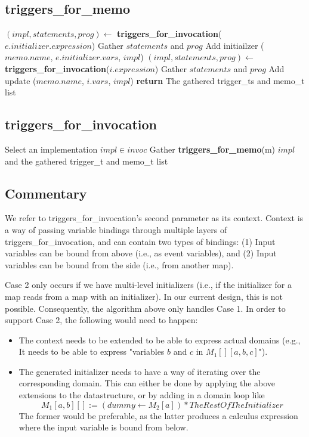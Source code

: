 \documentclass[11pt]{amsart}
\begin{document}
\subsection{triggers\_for\_memo}
\begin{algorithmic}
  \STATE $(impl,statements,prog) \gets$ \textbf{triggers\_for\_invocation}($e.initializer.expression$)
  \STATE Gather $statements$ and $prog$
  \STATE Add initiailzer ($memo.name$, $e.initializer.vars$, $impl$)
    \STATE $(impl,statements,prog) \gets$ \textbf{triggers\_for\_invocation}($i.expression$)
    \STATE Gather $statements$ and $prog$
    \STATE Add update ($memo.name$, $i.vars$, $impl$)
  \ENDFOR
\ENDFOR
\STATE \textbf{return} The gathered trigger\_ts and memo\_t list
\end{algorithmic}

\subsection{triggers\_for\_invocation}
\begin{algorithmic}
\STATE Select an implementation $impl \in invoc$
  \STATE Gather \textbf{triggers\_for\_memo}(m)
\ENDFOR
\RETURN $impl$ and the gathered trigger\_t and memo\_t list
\end{algorithmic}

\subsection{Commentary}
We refer to triggers\_for\_invocation's second parameter as its context.  Context is a way of passing variable bindings through multiple layers of triggers\_for\_invocation, and can contain two types of bindings: (1) Input variables can be bound from above (i.e., as event variables), and (2) Input variables can be bound from the side (i.e., from another map).  

Case 2 only occurs if we have multi-level initializers (i.e., if the initializer for a map reads from a map with an initializer).  In our current design, this is not possible.  Consequently, the algorithm above only handles Case 1.  In order to support Case 2, the following would need to happen:
\begin{itemize}
\item The context needs to be extended to be able to express actual domains (e.g., It needs to be able to express "variables $b$ and $c$ in $M_1[][a,b,c]$").
\item The generated initializer needs to have a way of iterating over the corresponding domain.  This can either be done by applying the above extensions to the datastructure, or by adding in a domain loop like 
$$M_1[a,b][] :=  (dummy \leftarrow M_2[a]) * TheRestOfTheInitializer$$
The former would be preferable, as the latter produces a calculus expression where the input variable is bound from below.
\end{itemize}
\end{document}

